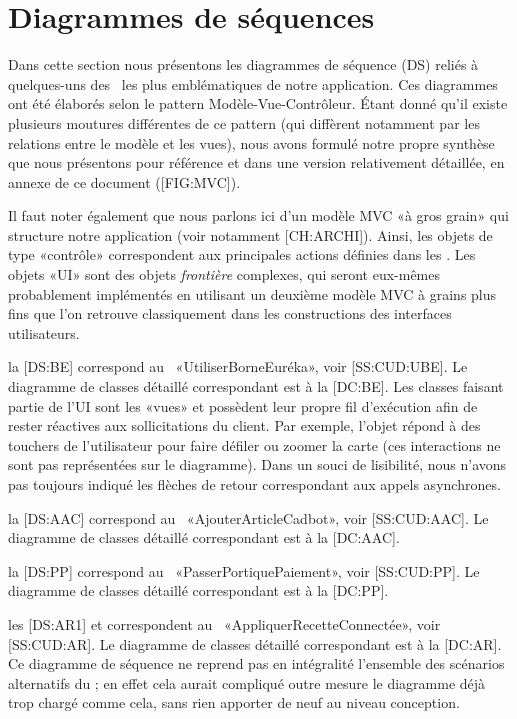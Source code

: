 \chapter{Diagrammes de séquences}

Dans cette section nous présentons les diagrammes de séquence (DS) reliés à quelques-uns des \cu\ les plus emblématiques de notre application.
\crlf
Ces diagrammes ont été élaborés selon le pattern Modèle-Vue-Contrôleur.
Étant donné qu'il existe plusieurs moutures différentes de ce pattern (qui diffèrent notamment par les relations entre le modèle et les vues), nous avons formulé notre propre synthèse que nous présentons pour référence et dans une version relativement détaillée, en annexe de ce document ([FIG:MVC]).
\par
Il faut noter également que nous parlons ici d'un modèle MVC «à gros grain» qui structure notre application (voir notamment [CH:ARCHI]). 
Ainsi, les objets de type «contrôle» correspondent aux principales actions définies dans les \cu.
Les objets «UI» sont des objets {\em frontière} complexes, qui seront eux-mêmes probablement implémentés en utilisant un deuxième modèle MVC à grains plus fins que l'on retrouve classiquement dans les constructions des interfaces utilisateurs.

\startitemize
\item la [DS:BE] correspond au \cu\ «UtiliserBorneEuréka», voir [SS:CUD:UBE].
Le diagramme de classes détaillé correspondant est à la [DC:BE].
Les classes faisant partie de l'UI sont les «vues» et possèdent leur propre fil d'exécution afin de rester réactives aux sollicitations du client.
Par exemple, l'objet  répond à des touchers de l'utilisateur pour faire défiler ou zoomer la carte (ces interactions ne sont pas représentées sur le diagramme).
Dans un souci de lisibilité, nous n'avons pas toujours indiqué les flèches de retour correspondant aux appels asynchrones.

\item la [DS:AAC] correspond au \cu\ «AjouterArticleCadbot», voir [SS:CUD:AAC].
Le diagramme de classes détaillé correspondant est à la [DC:AAC].

\item la [DS:PP] correspond au \cu\ «PasserPortiquePaiement», voir [SS:CUD:PP].
Le diagramme de classes détaillé correspondant est à la [DC:PP].

\item les [DS:AR1] et \in[DS:AR2] correspondent au \cu\ «AppliquerRecetteConnectée», voir [SS:CUD:AR].
Le diagramme de classes détaillé correspondant est à la [DC:AR].
Ce diagramme de séquence ne reprend pas en intégralité l'ensemble des scénarios alternatifs du \cu; en effet cela aurait compliqué outre mesure le diagramme déjà trop chargé comme cela, sans rien apporter de neuf au niveau conception.

